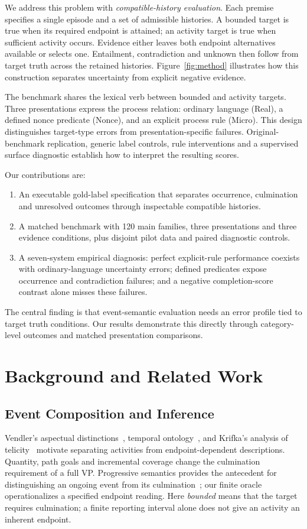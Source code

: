 \documentclass[sigconf,anonymous,review]{acmart}
\begin{document}
We address this problem with \emph{compatible-history evaluation}. Each premise specifies a single episode and a set of admissible histories. A bounded target is true when its required endpoint is attained; an activity target is true when sufficient activity occurs. Evidence either leaves both endpoint alternatives available or selects one. Entailment, contradiction and unknown then follow from target truth across the retained histories. Figure~\ref{fig:method} illustrates how this construction separates uncertainty from explicit negative evidence.

The benchmark shares the lexical verb between bounded and activity targets. Three presentations express the process relation: ordinary language (Real), a defined nonce predicate (Nonce), and an explicit process rule (Micro). This design distinguishes target-type errors from presentation-specific failures. Original-benchmark replication, generic label controls, rule interventions and a supervised surface diagnostic establish how to interpret the resulting scores.

Our contributions are:
\begin{enumerate}
\item An executable gold-label specification that separates occurrence, culmination and unresolved outcomes through inspectable compatible histories.
\item A matched benchmark with 120 main families, three presentations and three evidence conditions, plus disjoint pilot data and paired diagnostic controls.
\item A seven-system empirical diagnosis: perfect explicit-rule performance coexists with ordinary-language uncertainty errors; defined predicates expose occurrence and contradiction failures; and a negative completion-score contrast alone misses these failures.
\end{enumerate}
The central finding is that event-semantic evaluation needs an error profile tied to target truth conditions. Our results demonstrate this directly through category-level outcomes and matched presentation comparisons.

\section{Background and Related Work}
\subsection{Event Composition and Inference}
Vendler's aspectual distinctions~\cite{vendler1957}, temporal ontology~\cite{moens1988}, and Krifka's analysis of telicity~\cite{krifka1998} motivate separating activities from endpoint-dependent descriptions. Quantity, path goals and incremental coverage change the culmination requirement of a full VP. Progressive semantics provides the antecedent for distinguishing an ongoing event from its culmination~\cite{landman1992}; our finite oracle operationalizes a specified endpoint reading. Here \emph{bounded} means that the target requires culmination; a finite reporting interval alone does not give an activity an inherent endpoint.
\end{document}
